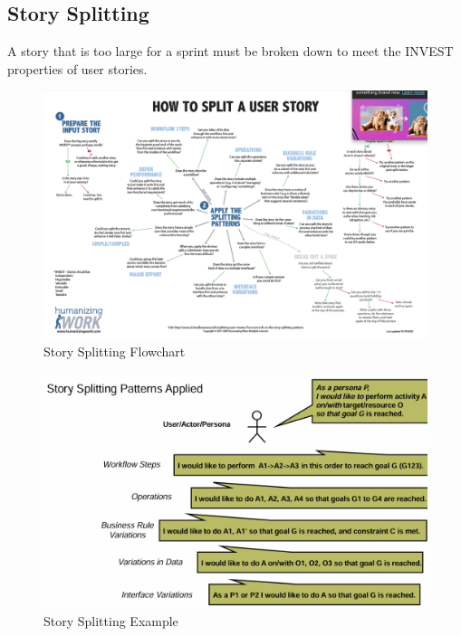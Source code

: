 \documentclass[../Main.tex]{subfiles}
\begin{document}
\subsection{Story Splitting}
A story that is too large for a sprint must be broken down
to meet the INVEST properties of user stories.
\begin{figure}[H]
    \centering
    \includegraphics[angle=90,height=1\textwidth]{Images/storysplitting.png}
    \caption{Story Splitting Flowchart}
\end{figure}
\newpage

\begin{figure}[H]
    \centering
    \includegraphics[width=1\linewidth]{Images/appliedstorysplitting.png}
    \caption{Story Splitting Example}
\end{figure}
\end{document}
